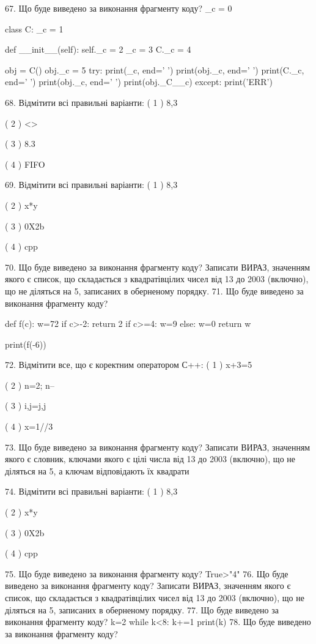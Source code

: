 \documentclass[11pt]{article}
\begin{document}
67. Що буде виведено за виконання фрагменту коду?
_c = 0

class C:
    _c = 1
    
    def __init__(self):
        self._c = 2
        _c = 3
        C._c = 4

obj = C()
obj._c = 5
try:
    print(_c, end=' ')
    print(obj._c, end=' ')
    print(C._c, end=' ')
    print(obj._c, end=' ')
    print(obj._C__c)
except:
    print('ERR')

68. Відмітити всі правильні варіанти:
( 1 ) 8,3

( 2 ) <>

( 3 ) 8.3

( 4 ) FIFO

69. Відмітити всі правильні варіанти:
( 1 ) 8,3

( 2 ) x*y

( 3 ) 0X2b

( 4 ) cpp

70. Що буде виведено за виконання фрагменту коду?
Записати ВИРАЗ, значенням якого є список, що складається з квадратівцілих чисел від 13 до 2003 (включно), що не діляться на 5, записаних в оберненому порядку.
71. Що буде виведено за виконання фрагменту коду?

def f(c):
    w=72
    if c>-2: 
        return 2
    if c>=4:
         w=9
    else:
         w=0
    return w

print(f(-6))

72. Відмітити все, що є коректним оператором С++:
( 1 ) x+3=5

( 2 ) n=2; n--

( 3 ) i,j=j,j

( 4 ) x=1//3

73. Що буде виведено за виконання фрагменту коду?
Записати ВИРАЗ, значенням якого є словник, ключами якого є цілі числа від 13 до 2003 (включно), що не діляться на 5, а ключам відповідають їх квадрати 

74. Відмітити всі правильні варіанти:
( 1 ) 8,3

( 2 ) x*y

( 3 ) 0X2b

( 4 ) cpp

75. Що буде виведено за виконання фрагменту коду?
True>"4"
76. Що буде виведено за виконання фрагменту коду?
Записати ВИРАЗ, значенням якого є список, що складається з квадратівцілих чисел від 13 до 2003 (включно), що не діляться на 5, записаних в оберненому порядку.
77. Що буде виведено за виконання фрагменту коду?
k=2
   while k<8: k+=1
   print(k)
78. Що буде виведено за виконання фрагменту коду?
\end{document}
